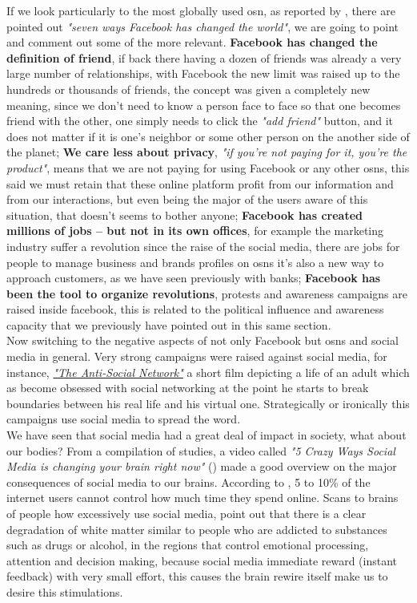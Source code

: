 \indent If we look particularly to the most globally used \gls{osn}, as reported by \cite{relrevfacebook}, there are pointed out \textit{"seven ways Facebook has changed the world"}, we are going to point and comment out some of the more relevant. \textbf{Facebook has changed the definition of friend}, if back there having a dozen of friends was already a very large number of relationships, with Facebook the new limit was raised up to the hundreds or thousands of friends, the concept was given a completely new meaning, since we don't need to know a person face to face so that one becomes friend with the other, one simply needs to click the \textit{"add friend"} button, and it does not matter if it is one's neighbor or some other person on the another side of the planet; \textbf{We care less about privacy}, \textit{"if you’re not paying for it, you’re the product"}, means that we are not paying for using Facebook or any other \glspl{osn}, this said we must retain that these online platform profit from our information and from our interactions, but even being the major of the users aware of this situation, that doesn't seems to bother anyone; \textbf{Facebook has created millions of jobs – but not in its own offices}, for example the marketing industry suffer a revolution since the raise of the social media, there are jobs for people to manage business and brands profiles on \glspl{osn} it's also a new way to approach customers, as we have seen previously with banks; \textbf{Facebook has been the tool to organize revolutions}, protests and awareness campaigns are raised inside facebook, this is related to the political influence and awareness capacity that we previously have pointed out in this same section.\\
\indent Now switching to the negative aspects of not only Facebook but \glspl{osn} and social media in general. Very strong campaigns were raised against social media, for instance, \href{http://www.imdb.com/title/tt3333168/}{\textit{"The Anti-Social Network"}} a short film depicting a life of an adult which as become obsessed with social networking at the point he starts to break boundaries between his real life and his virtual one. Strategically or ironically this campaigns use social media to spread the word.\\
\indent We have seen that social media had a great deal of impact in society, what about our bodies? From a compilation of studies, a video called \textit{"5 Crazy Ways Social Media is changing your brain right now"} (\cite{asapscience}) made a good overview on the major consequences of social media to our brains. According to \cite{asapscience}, 5 to 10\% of the internet users cannot control how much time they spend online. Scans to brains of people how excessively use social media, point out that there is a clear degradation of white matter similar to people who are addicted to substances such as drugs or alcohol, in the regions that control emotional processing, attention and decision making, because social media immediate reward (instant feedback) with very small effort, this causes the brain rewire itself make us to desire this stimulations.
